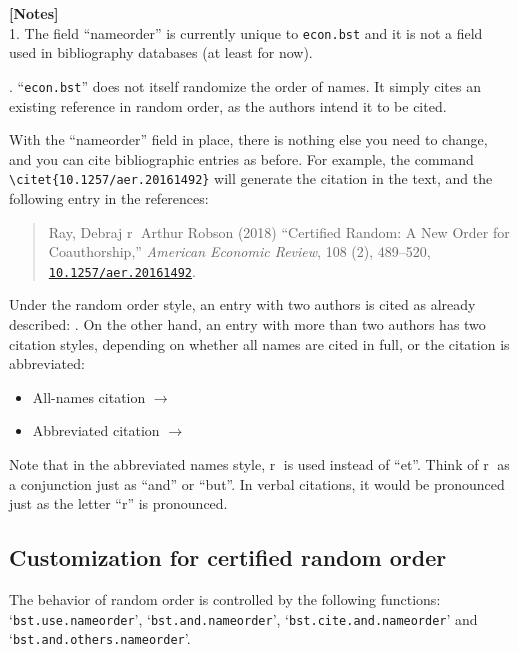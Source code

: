 \documentclass[10pt]{article}
\begin{document}
\noindent \textbf{[Notes]} \\
1. The field ``nameorder'' is currently unique to \texttt{econ.bst} and it
is not a field used in bibliography databases (at least for now).

. ``\texttt{econ.bst}'' does not itself randomize the order of
names. It simply cites an existing reference in random order, as the authors
intend it to be cited.
\vspace*{1em}


With the ``nameorder'' field in place, there is nothing else you need to change,
and you can cite bibliographic entries as before.  For example, the command
\verb|\citet{10.1257/aer.20161492}| will generate the citation
\citet{10.1257/aer.20161492} in the text, and the following entry in the
references:

\begin{quote}
Ray, Debraj \textcircled{r} Arthur Robson (2018) ``Certified Random: A New
Order for Coauthorship,'' \textit{American Economic Review}, 108 (2),
489--520, \href{http://dx.doi.org/10.1257/aer.20161492}{
\nolinkurl{10.1257/aer.20161492}}.
\end{quote}

Under the random order style, an entry with two authors is cited as already
described: \citet{10.1257/aer.20161492}. On the other hand, an entry with more
than two authors has two citation styles, depending on whether all names are
cited in full, or the citation is abbreviated:
\begin{itemize}
 \item All-names citation $\longrightarrow$ \citet*{NBERw25205}
 \item Abbreviated citation $\longrightarrow$ \citet{NBERw25205}
\end{itemize}

Note that in the abbreviated names style, \textcircled{r} is used instead of
``et''. Think of \textcircled{r} as a conjunction just as ``and'' or ``but''. In
verbal citations, it would be pronounced just as the letter ``r'' is pronounced.

\subsection{Customization for certified random order}

The behavior of random order is controlled by the following functions:
`\texttt{bst.use.nameorder}', `\texttt{bst.and.nameorder}',
`\texttt{bst.cite.and.nameorder}' and `\texttt{bst.and.others.nameorder}'.
\vspace*{1em}
\end{document}
